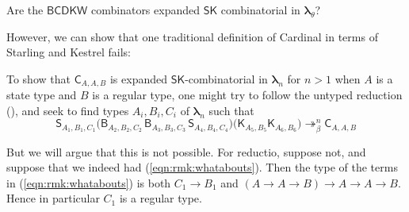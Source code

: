 \documentclass{lmcs} %
\newcommand{\param}{\theta}
\newcommand{\mlt}[1]{\boldsymbol\lambda_{#1}}
\newcommand{\mltup}{\boldsymbol\lambda_{\param}}
\newcommand{\transreduces}[2]{\twoheadrightarrow_{#1}^{#2}}
\newcommand{\ctK}[4]{{\mathsf K}_{#1, #2}#3#4}
\newcommand{\ctS}[6]{{\mathsf S}_{#1, #2, #3}#4#5#6}
\newcommand{\ctC}[6]{{\mathsf C}_{#1, #2, #3}#4#5#6}
\newcommand{\ctB}[6]{{\mathsf B}_{#1, #2, #3}#4#5#6}
\begin{document}
\begin{qu}\label{qu:whatabouts}
Are the $\mathsf{BCDKW}$ combinators expanded $\mathsf{SK}$ combinatorial in $\mltup$?
\end{qu}

However, we can show that one traditional definition of Cardinal in terms of Starling and Kestrel fails:

\begin{rem}\label{rmk:whatabouts}
To show that $\ctC{A}{A}{B}{}{}{}$ is expanded $\mathsf{SK}$-combinatorial in $\mlt{n}$ for $n>1$ when $A$ is a state type and $B$ is a regular type, one might try to follow the untyped reduction (\cite[pp. 158-159]{Curry1958-yi}), and seek to find types $A_i, B_i, C_i$ of $\mlt{n}$ such that
\begin{equation}\label{eqn:rmk:whatabouts}
\ctS{A_1}{B_1}{C_1}{\big(\ctB{A_2}{B_2}{C_2}{}{}{}\,\ctB{A_3}{B_3}{C_3}{}{}{}\,\ctS{A_4}{B_4}{C_4}{}{}{}\big)}{\big(\ctK{A_5}{B_5}{}{}\ctK{A_6}{B_6}{}{}\big)}{} \transreduces{\beta}{n} \ctC{A}{A}{B}{}{}{}
\end{equation}

But we will argue that this is not possible. For reductio, suppose not, and suppose that we indeed had (\ref{eqn:rmk:whatabouts}). Then the type of the terms in (\ref{eqn:rmk:whatabouts}) is both $C_1\rightarrow B_1$ and $(A\rightarrow A\rightarrow B)\rightarrow A\rightarrow A\rightarrow B$. Hence in particular $C_1$ is a regular type. 


\end{rem}
\end{document}
